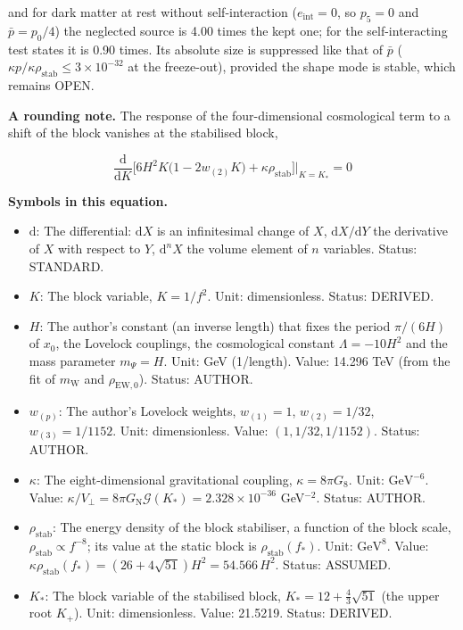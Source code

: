 \documentclass[
  10pt,
]{article}
\providecommand{\tightlist}{%
  \setlength{\itemsep}{0pt}\setlength{\parskip}{0pt}}
\begin{document}
and for dark matter at rest without self-interaction
(\(e_{\mathrm{int}} = 0\), so \(p_5 = 0\) and \(\bar p = p_0/4\)) the
neglected source is 4.00 times the kept one; for the self-interacting
test states it is 0.90 times. Its absolute size is suppressed like that
of \(\bar p\)
(\(\kappa p/\kappa\rho_{\mathrm{stab}} \le 3\times10^{-32}\) at the
freeze-out), provided the shape mode is stable, which remains OPEN.

\textbf{A rounding note.} The response of the four-dimensional
cosmological term to a shift of the block vanishes at the stabilised
block,

\[
\frac{\mathrm{d}}{\mathrm{d}K}\Big[6H^2K\big(1 - 2w_{(2)}K\big) + \kappa\rho_{\mathrm{stab}}\Big]\Big\vert_{K = K_*} = 0
\]

\textbf{Symbols in this equation.}

\begin{itemize}
\tightlist
\item
  \(\mathrm{d}\): The differential: \(\mathrm{d}X\) is an infinitesimal
  change of \(X\), \(\mathrm{d}X/\mathrm{d}Y\) the derivative of \(X\)
  with respect to \(Y\), \(\mathrm{d}^nX\) the volume element of \(n\)
  variables. Status: STANDARD.
\item
  \(K\): The block variable, \(K = 1/f^2\). Unit: dimensionless. Status:
  DERIVED.
\item
  \(H\): The author's constant (an inverse length) that fixes the period
  \(\pi/(6H)\) of \(x_0\), the Lovelock couplings, the cosmological
  constant \(\Lambda = -10H^2\) and the mass parameter \(m_\Psi = H\).
  Unit: GeV (1/length). Value: 14.296 TeV (from the fit of
  \(m_{\mathrm{W}}\) and \(\rho_{\mathrm{EW},0}\)). Status: AUTHOR.
\item
  \(w_{(p)}\): The author's Lovelock weights, \(w_{(1)} = 1\),
  \(w_{(2)} = 1/32\), \(w_{(3)} = 1/1152\). Unit: dimensionless. Value:
  \((1, 1/32, 1/1152)\). Status: AUTHOR.
\item
  \(\kappa\): The eight-dimensional gravitational coupling,
  \(\kappa = 8\pi G_8\). Unit: \(\mathrm{GeV}^{-6}\). Value:
  \(\kappa/V_\perp = 8\pi G_{\mathrm{N}}\mathcal{G}(K_*) = 2.328\times10^{-36}\)
  GeV\(^{-2}\). Status: AUTHOR.
\item
  \(\rho_{\mathrm{stab}}\): The energy density of the block stabiliser,
  a function of the block scale,
  \(\rho_{\mathrm{stab}} \propto f^{-8}\); its value at the static block
  is \(\rho_{\mathrm{stab}}(f_*)\). Unit: \(\mathrm{GeV}^{8}\). Value:
  \(\kappa\rho_{\mathrm{stab}}(f_*) = (26 + 4\sqrt{51})H^2 = 54.566\,H^2\).
  Status: ASSUMED.
\item
  \(K_*\): The block variable of the stabilised block,
  \(K_* = 12 + \frac43\sqrt{51}\) (the upper root \(K_+\)). Unit:
  dimensionless. Value: 21.5219. Status: DERIVED.
\end{itemize}
\end{document}

